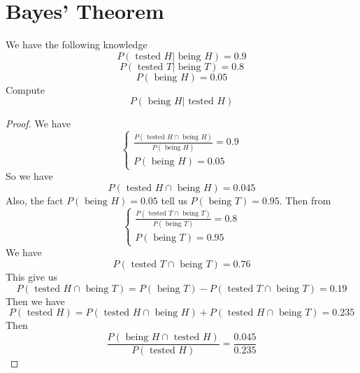 \documentclass{report}
\begin{document}
\section{Bayes' Theorem}
\begin{question}{}{}
We have the following knowledge 
\begin{equation*}
P\left(\text{ tested }H|\text{ being }H\right)=0.9
\end{equation*}
\begin{equation*}
P\left(\text{ tested }T|\text{ being }T\right)=0.8
\end{equation*}
\begin{equation*}
P\left(\text{ being }H \right)=0.05
\end{equation*}
Compute
\begin{equation*}
P\left(\text{ being }H|\text{ tested }H\right)
\end{equation*}
\end{question}
\begin{proof}
We have 
\begin{equation*}
\begin{cases}
  \frac{P\left(\text{ tested }H\cap \text{ being }H \right)}{P\left(\text{ being }H \right)}=0.9\\
  P\left(\text{ being }H \right)=0.05
\end{cases}
\end{equation*}
So we have 
\begin{equation*}
P\left(\text{ tested }H\cap \text{ being }H \right)=0.045
\end{equation*}
Also, the fact $P\left(\text{ being }H \right)=0.05$ tell us $P\left(\text{ being }T \right)=0.95$. Then from 
\begin{equation*}
\begin{cases}
  \frac{P\left(\text{ tested }T\cap \text{ being }T \right)}{P\left(\text{ being }T \right)}=0.8\\
  P\left(\text{ being }T \right)=0.95
\end{cases}
\end{equation*}
We have
\begin{equation*}
P\left(\text{ tested }T\cap \text{ being }T \right)=0.76
\end{equation*}
This give us 
\begin{equation*}
P\left(\text{ tested }H\cap \text{ being }T \right)=P\left(\text{ being }T \right)-P\left(\text{ tested }T\cap \text{ being }T \right)=0.19
\end{equation*}
Then we have 
\begin{equation*}
P\left(\text{ tested }H \right)=P\left(\text{ tested }H\cap \text{ being }H \right)+P\left(\text{ tested }H\cap \text{ being }T \right)=0.235
\end{equation*}
Then
\begin{equation*}
\frac{P\left(\text{ being }H\cap \text{ tested }H \right)}{P\left(\text{ tested }H \right)}=\frac{0.045}{0.235}
\end{equation*}
\end{proof}
\end{document}
